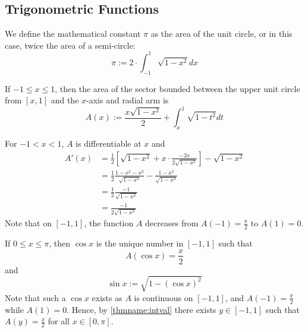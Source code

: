 \documentclass[12pt, a4paper, oneside, openright, titlepage]{book}
\begin{document}
\begin{subappendices}
    \section{Trigonometric Functions}

    \begin{defn}
        We define the mathematical constant $\pi$ as the area of the unit circle, or in this case, twice the area of a semi-circle:\begin{equation}
            \pi:=2\cdot \int_{-1}^1\sqrt{1-x^2}dx
        \end{equation}
    \end{defn}


    \begin{defn}
        If $-1 \leq x \leq 1$, then the area of the sector bounded between the upper unit circle from $[x,1]$ and the $x$-axis and radial arm is \begin{equation}
            A(x) := \frac{x\sqrt{1-x^2}}{2} + \int_x^1\sqrt{1-t^2}dt
        \end{equation}
    \end{defn}

    \begin{rmk}
        For $-1 < x < 1$, $A$ is differentiable at $x$ and \begin{align*}
            A'(x) &= \frac{1}{2}\left[\sqrt{1-x^2} +x\cdot\frac{-2x}{2\sqrt{1-x^2}}\right] -\sqrt{1-x^2} \\
            &= \frac{1}{2}\frac{1-x^2-x^2}{\sqrt{1-x^2}} - \frac{1-x^2}{\sqrt{1-x^2}} \\
            &= \frac{1}{2}\frac{-1}{\sqrt{1-x^2}} \\
            &= \frac{-1}{2\sqrt{1-x^2}}
        \end{align*}
        Note that on $[-1,1]$, the function $A$ decreases from $A(-1) = \frac{\pi}{2}$ to $A(1) = 0$.
    \end{rmk}

    \begin{defn}
        If $0 \leq x \leq \pi$, then $\cos x$ is the unique number in $[-1,1]$ such that \begin{equation}
            A(\cos x) = \frac{x}{2}
        \end{equation}
        and \begin{equation}
            \sin x := \sqrt{1-(\cos x)^2}
        \end{equation}
        Note that such a $\cos x$ exists as $A$ is continuous on $[-1,1]$, and $A(-1) = \frac{\pi}{2}$ while $A(1) = 0$. Hence, by \ref{thmname:intval} there exists $y \in [-1,1]$ such that $A(y) = \frac{x}{2}$ for all $x \in [0,\pi]$.
    \end{defn}



\end{subappendices}
\end{document}
